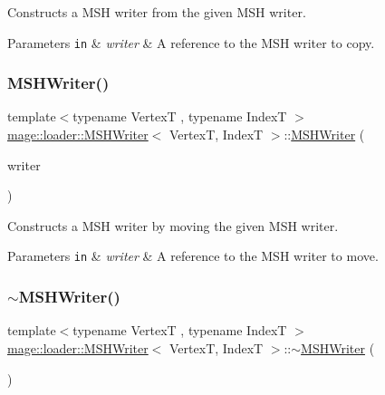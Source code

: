 Constructs a M\+SH writer from the given M\+SH writer.


\begin{DoxyParams}[1]{Parameters}
\mbox{\tt in}  & {\em writer} & A reference to the M\+SH writer to copy. \\
\hline
\end{DoxyParams}
\hypertarget{classmage_1_1loader_1_1_m_s_h_writer_a31892f7b5edc957e9de92fd24ef720b9}{}\label{classmage_1_1loader_1_1_m_s_h_writer_a31892f7b5edc957e9de92fd24ef720b9} 
\subsubsection{\texorpdfstring{M\+S\+H\+Writer()}{MSHWriter()}\hspace{0.1cm}{\footnotesize\ttfamily [3/3]}}
{\footnotesize\ttfamily template$<$typename VertexT , typename IndexT $>$ \\
\hyperlink{classmage_1_1loader_1_1_m_s_h_writer}{mage\+::loader\+::\+M\+S\+H\+Writer}$<$ VertexT, IndexT $>$\+::\hyperlink{classmage_1_1loader_1_1_m_s_h_writer}{M\+S\+H\+Writer} (\begin{DoxyParamCaption}\item[{\hyperlink{classmage_1_1loader_1_1_m_s_h_writer}{M\+S\+H\+Writer}$<$ VertexT, IndexT $>$ \&\&}]{writer }\end{DoxyParamCaption})\hspace{0.3cm}{\ttfamily [noexcept]}}

Constructs a M\+SH writer by moving the given M\+SH writer.


\begin{DoxyParams}[1]{Parameters}
\mbox{\tt in}  & {\em writer} & A reference to the M\+SH writer to move. \\
\hline
\end{DoxyParams}
\hypertarget{classmage_1_1loader_1_1_m_s_h_writer_a91cff6fd4ba009db4b2db82d18ca533e}{}\label{classmage_1_1loader_1_1_m_s_h_writer_a91cff6fd4ba009db4b2db82d18ca533e} 
\subsubsection{\texorpdfstring{$\sim$\+M\+S\+H\+Writer()}{~MSHWriter()}}
{\footnotesize\ttfamily template$<$typename VertexT , typename IndexT $>$ \\
\hyperlink{classmage_1_1loader_1_1_m_s_h_writer}{mage\+::loader\+::\+M\+S\+H\+Writer}$<$ VertexT, IndexT $>$\+::$\sim$\hyperlink{classmage_1_1loader_1_1_m_s_h_writer}{M\+S\+H\+Writer} (\begin{DoxyParamCaption}{ }\end{DoxyParamCaption})}

